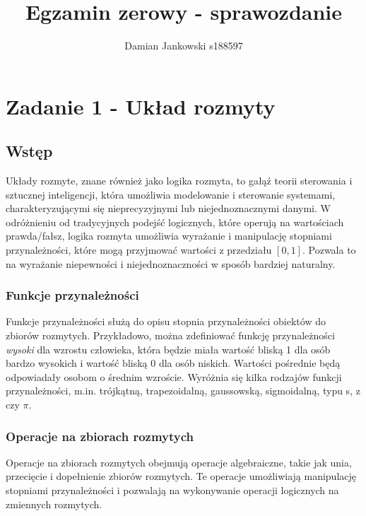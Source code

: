 \documentclass{article}
\title{Egzamin zerowy - sprawozdanie}
\author{Damian Jankowski s188597}
\begin{document}
\maketitle

\tableofcontents

\section{Zadanie 1 - Układ rozmyty}

\subsection{Wstęp}

Układy rozmyte, znane również jako logika rozmyta, 
to gałąź teorii sterowania i sztucznej inteligencji, 
która umożliwia modelowanie i sterowanie systemami, 
charakteryzującymi się nieprecyzyjnymi lub niejednoznacznymi danymi. 
W odróżnieniu od tradycyjnych podejść logicznych, 
które operują na wartościach prawda/fałsz, 
logika rozmyta umożliwia wyrażanie i manipulację stopniami 
przynależności, które mogą przyjmować wartości z przedziału $[0, 1]$.
Pozwala to na wyrażanie niepewności i niejednoznaczności w sposób 
bardziej naturalny.

\subsubsection{Funkcje przynależności}

Funkcje przynależności służą do opisu stopnia przynależności obiektów 
do zbiorów rozmytych. Przykładowo, można zdefiniować funkcję 
przynależności \textit{wysoki} dla wzrostu człowieka, która będzie miała 
wartość bliską 1 dla osób bardzo wysokich i wartość bliską 0 dla 
osób niskich. Wartości pośrednie będą odpowiadały osobom o
średnim wzroście. Wyróżnia się kilka rodzajów funkcji
przynależności, m.in. trójkątną, trapezoidalną, gaussowską,
sigmoidalną, typu s, z czy $\pi$.

\subsubsection{Operacje na zbiorach rozmytych}

Operacje na zbiorach rozmytych obejmują operacje algebraiczne, 
takie jak unia, przecięcie i dopełnienie zbiorów rozmytych. 
Te operacje umożliwiają manipulację stopniami przynależności 
i pozwalają na wykonywanie operacji logicznych na zmiennych rozmytych.
\end{document}
